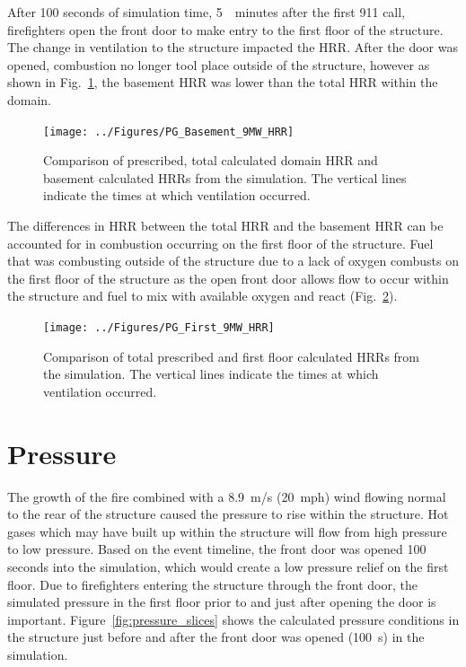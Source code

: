 \documentclass[12pt,oneside]{book}
\begin{document}
After 100 seconds of simulation time, 5~~minutes after the first 911 call, firefighters open the front door to make entry to the first floor of the structure. The change in ventilation to the structure impacted the HRR. After the door was opened, combustion no longer tool place outside of the structure, however as shown in Fig.~\ref{fig:PG_Basement_9MW_HRR}, the basement HRR was lower than the total HRR within the domain.

\begin{figure}[!ht]
\texttt{[image: ../Figures/PG\_Basement\_9MW\_HRR]}
\caption[Prescribed, calculated domain, and calculated basement HRRs vs. time from the simulation.]
{Comparison of prescribed, total calculated domain HRR and basement calculated HRRs from the simulation. The vertical lines indicate the times at which ventilation occurred.}
\label{fig:PG_Basement_9MW_HRR}
\end{figure}

The differences in HRR between the total HRR and the basement HRR can be accounted for in combustion occurring on the first floor of the structure. Fuel that was combusting outside of the structure due to a lack of oxygen combusts on the first floor of the structure as the open front door allows flow to occur within the structure and fuel to mix with available oxygen and react (Fig.~\ref{fig:PG_First_9MW_HRR}).

\begin{figure}[!ht]
\texttt{[image: ../Figures/PG\_First\_9MW\_HRR]}
\caption[Prescribed and first floor calculated HRR vs. time from the simulation.]
{Comparison of total prescribed and first floor calculated HRRs from the simulation. The vertical lines indicate the times at which ventilation occurred.}
\label{fig:PG_First_9MW_HRR}
\end{figure}

\clearpage

\section{Pressure}
\label{pressure}

The growth of the fire combined with a 8.9~m/s (20~mph) wind flowing normal to the rear of the structure caused the pressure to rise within the structure. Hot gases which may have built up within the structure will flow from high pressure to low pressure. Based on the event timeline, the front door was opened 100 seconds into the simulation, which would create a low pressure relief on the first floor. Due to firefighters entering the structure through the front door, the simulated pressure in the first floor prior to and just after opening the door is important. Figure~\ref{fig:pressure_slices} shows the calculated pressure conditions in the structure just before and after the front door was opened (100~s) in the simulation.
\end{document}
